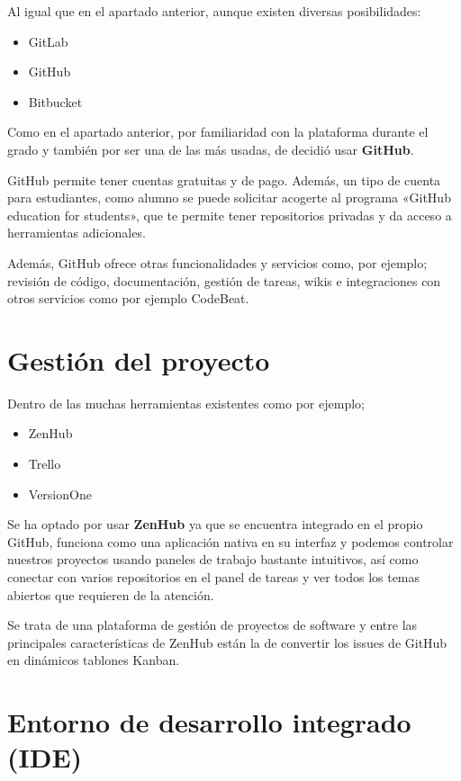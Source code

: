 Al igual que en el apartado anterior, aunque existen diversas posibilidades:
\begin{itemize}
\item GitLab
\item GitHub
\item Bitbucket
\end{itemize}

Como en el apartado anterior, por familiaridad con la plataforma durante el grado y también por ser una de las más usadas, de decidió usar \textbf {GitHub}.

GitHub permite tener cuentas gratuitas y de pago. Además, un tipo de cuenta para estudiantes, como alumno se puede solicitar acogerte al programa «GitHub education for students», que te permite tener repositorios privadas y da acceso a herramientas adicionales.

Además, GitHub ofrece otras funcionalidades y servicios como, por ejemplo; revisión de código, documentación, gestión de tareas, wikis e integraciones con otros servicios como por ejemplo CodeBeat.

\section{Gestión del proyecto}

Dentro de las muchas herramientas existentes como por ejemplo;
\begin{itemize}
\item ZenHub
\item Trello
\item VersionOne
\end{itemize}

Se ha optado por usar  \textbf {ZenHub} ya que se encuentra integrado en el propio GitHub, funciona como una aplicación nativa en su interfaz y podemos controlar nuestros proyectos usando paneles de trabajo bastante intuitivos, así como conectar con varios repositorios en el panel de tareas y ver todos los temas abiertos que requieren de la atención.

Se trata de una plataforma de gestión de proyectos de software y entre las principales características de ZenHub están la de convertir los issues de GitHub en dinámicos tablones Kanban.

\section{Entorno de desarrollo integrado (IDE)}


